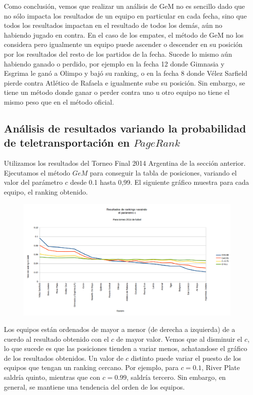 Como conclusión, vemos que realizar un análisis de GeM no es sencillo dado que no sólo impacta los resultados de un equipo en particular en cada fecha, sino que todos los resultados impactan en el resultado de todos los demás, aún no habiendo jugado en contra. En el caso de los empates, el método de GeM no los considera pero igualmente un equipo puede ascender o descender en su posición por los resultados del resto de los partidos de la fecha. Sucede lo mismo aún habiendo ganado o perdido, por ejemplo en la fecha 12 donde Gimnasia y Esgrima le ganó a Olimpo y bajó su ranking, o en la fecha 8 donde Vélez Sarfield pierde contra Atlético de Rafaela e igualmente sube su posición. Sin embargo, se tiene un método donde ganar o perder contra uno u otro equipo no tiene el mismo peso que en el método oficial.


\subsection{Análisis de resultados variando la probabilidad de teletransportación en $PageRank$}

Utilizamos los resultados del Torneo Final 2014 Argentina de la sección anterior. Ejecutamos el método $GeM$ para conseguir la tabla de posiciones, variando el valor del parámetro $c$ desde 0.1 hasta 0,99. El siguiente gráfico muestra para cada equipo, el ranking obtenido.\\

\begin{figure}[H]
\centering
\includegraphics[width=0.9\linewidth]{imagenes/varicionCfutbol2014Ordenado.png}
\end{figure}

Los equipos están ordenados de mayor a menor (de derecha a izquierda) de a cuerdo al resultado obtenido con el $c$ de mayor valor. Vemos que al disminuir el $c$, lo que sucede es que las posiciones tienden a variar menos, achatandose el gráfico de los resultados obtenidos.
Un valor de $c$ distinto puede variar el puesto de los equipos que tengan un ranking cercano. Por ejemplo, para $c=0.1$, River Plate saldría quinto, mientras que con $c=0.99$, saldría tercero. Sin embargo, en general, se mantiene una tendencia del orden de los equipos. \\

